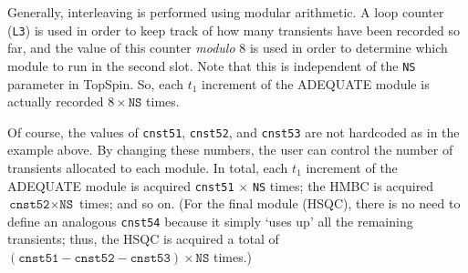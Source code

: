 \documentclass[a4paper,12pt]{article}
\newcommand{\nitrogen}{\ch{^{15}N}}
\begin{document}
\begin{refsection}
Generally, interleaving is performed using modular arithmetic.
A loop counter (\texttt{L3}) is used in order to keep track of how many transients have been recorded so far, and the value of this counter \textit{modulo} 8 is used in order to determine which module to run in the second slot.
Note that this is independent of the \texttt{NS} parameter in TopSpin.
So, each $t_1$ increment of the ADEQUATE module is actually recorded $8 \times \texttt{NS}$ times.


Of course, the values of \texttt{cnst51}, \texttt{cnst52}, and \texttt{cnst53} are not hardcoded as in the example above.
By changing these numbers, the user can control the number of transients allocated to each module.
In total, each $t_1$ increment of the ADEQUATE module is acquired \texttt{cnst51} $\times$ \texttt{NS} times; the \nitrogen{} HMBC is acquired $\texttt{cnst52} \times \texttt{NS}$ times; and so on.
(For the final module (HSQC), there is no need to define an analogous \texttt{cnst54} because it simply `uses up' all the remaining transients; thus, the HSQC is acquired a total of $(\texttt{cnst51} - \texttt{cnst52} - \texttt{cnst53}) \times \texttt{NS}$ times.)


\end{refsection}
\end{document}
